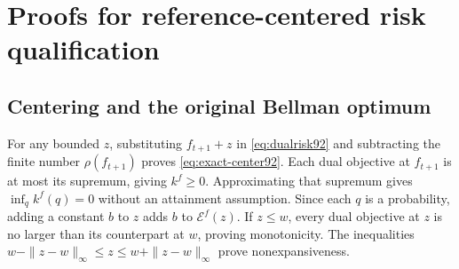 \section{Proofs for reference-centered risk qualification}\label{supp:centeredrisk92}
\subsection{Centering and the original Bellman optimum}
For any bounded $z$, substituting $f_{t+1}+z$ in \eqref{eq:dualrisk92} and subtracting the finite number $\rho(f_{t+1})$ proves \eqref{eq:exact-center92}. Each dual objective at $f_{t+1}$ is at most its supremum, giving $k^f\ge0$. Approximating that supremum gives $\inf_q k^f(q)=0$ without an attainment assumption. Since each $q$ is a probability, adding a constant $b$ to $z$ adds $b$ to $\mathcal E^f(z)$. If $z\le w$, every dual objective at $z$ is no larger than its counterpart at $w$, proving monotonicity. The inequalities $w-\|z-w\|_\infty\le z\le w+\|z-w\|_\infty$ prove nonexpansiveness.

